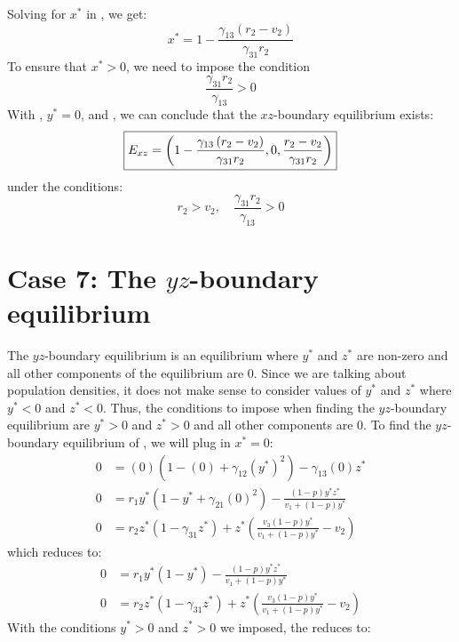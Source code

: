 Solving for $x^*$ in , we get:
\begin{equation}
    x^*=1-\frac{\gamma_{13}\left(r_2-v_2\right)}{\gamma_{31}r_2}
    \label{eq:4.13}
\end{equation}
To ensure that $x^*>0$, we need to impose the condition
\[
\frac{\gamma_{31}r_2}{\gamma_{13}}>0
\]
With , $y^*=0$, and , we can conclude that the $xz$-boundary equilibrium exists:
\[
\fbox{$\displaystyle E_{xz}=\left(
1-\frac{\gamma_{13}\left(r_2-v_2\right)}{\gamma_{31}r_2},
0,
\frac{r_2-v_2}{\gamma_{31}r_2}
\right)$}
\]
under the conditions:
\[
r_2>v_2,\quad \frac{\gamma_{31}r_2}{\gamma_{13}}>0
\]

\section{Case 7: The $yz$-boundary equilibrium}\label{sec:yz_boundary_equilibrium}
The $yz$-boundary equilibrium is an equilibrium where $y^*$ and $z^*$ are non-zero and all other components of the equilibrium are 0. Since we are talking about population densities, it does not make sense to consider values of $y^*$ and $z^*$ where $y^*<0$ and $z^*<0$. Thus, the conditions to impose when finding the $yz$-boundary equilibrium are $y^*>0$ and $z^*>0$ and all other components are 0. To find the $yz$-boundary equilibrium of , we will plug in $x^*=0$:
\begin{align*}
    0 &= (0)\left(1-(0)+\gamma_{12}\left(y^*\right)^2\right)-\gamma_{13}(0)z^*\\
    0 &= r_1y^*\left(1-y^*+\gamma_{21}(0)^2\right)-\frac{\left(1-p\right)y^*z^*}{v_1+\left(1-p\right)y^*}\\
    0 &= r_2z^*\left(1-\gamma_{31}z^*\right)+z^*\left(\frac{v_3\left(1-p\right)y^*}{v_1+\left(1-p\right)y^*}-v_2\right)
\end{align*}
which reduces to:
\begin{subequations}
    \begin{align}
        0 &= r_1y^*\left(1-y^*\right)-\frac{\left(1-p\right)y^*z^*}{v_1+\left(1-p\right)y^*}
        \label{eq:4.14a}\\
        0 &= r_2z^*\left(1-\gamma_{31}z^*\right)+z^*\left(\frac{v_3\left(1-p\right)y^*}{v_1+\left(1-p\right)y^*}-v_2\right)
        \label{eq:4.14b}
    \end{align}
    \label{eq:4.14}
\end{subequations}
With the conditions $y^*>0$ and $z^*>0$ we imposed, the  reduces to:
